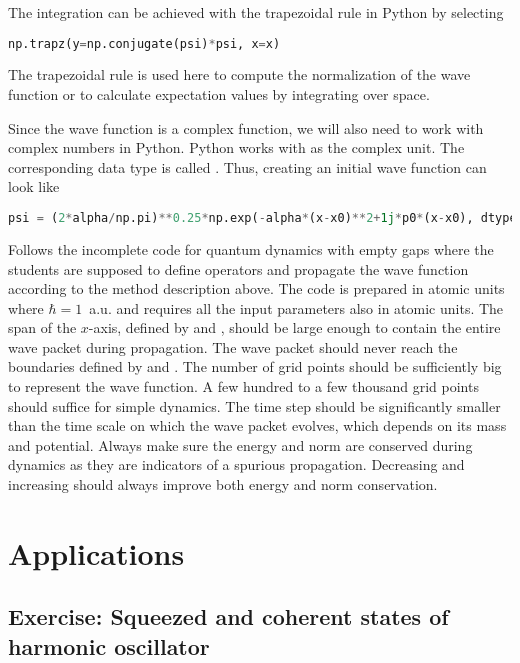 The integration can be achieved with the trapezoidal rule in Python by selecting
\begin{lstlisting}[language=Python, style=mystyle2]
np.trapz(y=np.conjugate(psi)*psi, x=x)
\end{lstlisting}
The trapezoidal rule is used here to compute the normalization of the wave function or to calculate expectation values by integrating over space.

Since the wave function is a complex function, we will also need to work with complex numbers in Python. Python works with  as the complex unit. The corresponding data type is called . Thus, creating an initial wave function can look like 
\begin{lstlisting}[language=Python, style=mystyle2]
psi = (2*alpha/np.pi)**0.25*np.exp(-alpha*(x-x0)**2+1j*p0*(x-x0), dtype=complex)
\end{lstlisting}

Follows the incomplete code for quantum dynamics with empty gaps where the students are supposed to define operators and propagate the wave function according to the method description above. The code is prepared in atomic units where $\hbar=1$~a.u. and requires all the input parameters also in atomic units. The span of the $x$-axis, defined by  and , should be large enough to contain the entire wave packet during propagation. The wave packet should never reach the boundaries defined by  and . The number of grid points should be sufficiently big to represent the wave function. A few hundred to a few thousand grid points should suffice for simple dynamics. The time step  should be significantly smaller than the time scale on which the wave packet evolves, which depends on its mass and potential. Always make sure the energy and norm are conserved during dynamics as they are indicators of a spurious propagation. Decreasing  and increasing  should always improve both energy and norm conservation. 

\lstset{style=mystyle}


\section{Applications}

\subsection*{Exercise: Squeezed and coherent states of harmonic oscillator}

